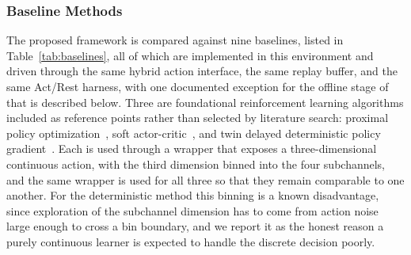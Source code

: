 \documentclass[journal]{IEEEtran}
\begin{document}
%
%
\subsubsection{Baseline Methods}
The proposed framework is compared against nine baselines, listed in Table~\ref{tab:baselines}, all of which are implemented in this environment and driven through the same hybrid action interface, the same replay buffer, and the same Act/Rest harness, with one documented exception for the offline stage of~\cite{xu2026} that is described below. Three are foundational reinforcement learning algorithms included as reference points rather than selected by literature search: proximal policy optimization~\cite{schulman2017}, soft actor-critic~\cite{haarnoja2018}, and twin delayed deterministic policy gradient~\cite{fujimoto2018}. Each is used through a wrapper that exposes a three-dimensional continuous action, with the third dimension binned into the four subchannels, and the same wrapper is used for all three so that they remain comparable to one another. For the deterministic method this binning is a known disadvantage, since exploration of the subchannel dimension has to come from action noise large enough to cross a bin boundary, and we report it as the honest reason a purely continuous learner is expected to handle the discrete decision poorly.
\end{document}
